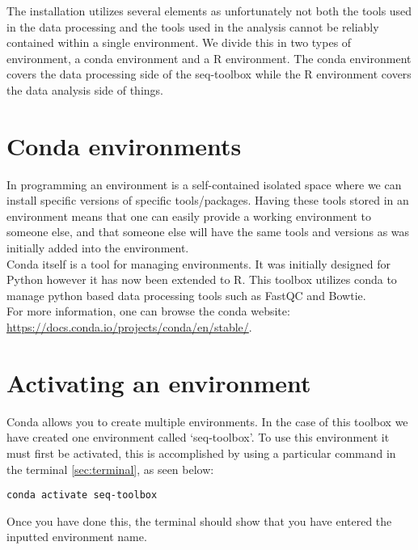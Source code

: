 \label{chap:Install}
The installation utilizes several elements as unfortunately not both the tools used in the data processing and the tools used in the analysis cannot be reliably contained within a single environment. We divide this in two types of environment, a conda environment and a R environment. The conda environment covers the data processing side of the seq-toolbox while the R environment covers the data analysis side of things.

\section{Conda environments \label{sec:conda}}
In programming an environment is a self-contained isolated space where we can install specific versions of specific tools/packages. Having these tools stored in an environment means that one can easily provide a working environment to someone else, and that someone else will have the same tools and versions as was initially added into the environment.\\
Conda itself is a tool for managing environments. It was initially designed for Python however it has now been extended to R. This toolbox utilizes conda to manage python based data processing tools such as FastQC and Bowtie.\\
For more information, one can browse the conda website: \url{https://docs.conda.io/projects/conda/en/stable/}.\\
\section{Activating an environment}
Conda allows you to create multiple environments. In the case of this toolbox we have created one environment called `seq-toolbox'. To use this environment it must first be activated, this is accomplished by using a particular command in the terminal \autoref{sec:terminal}, as seen below:\\
\begin{lstlisting}
conda activate seq-toolbox
\end{lstlisting}
Once you have done this, the terminal should show that you have entered the inputted environment name.